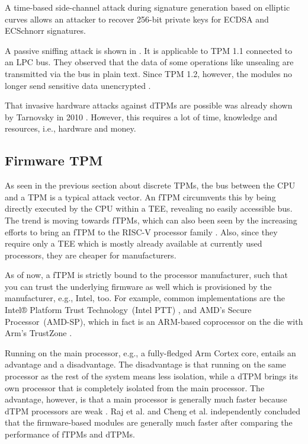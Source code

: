 A time-based side-channel attack \cite{Moghimi2019} during signature generation based on elliptic curves allows an attacker to recover 256-bit private keys for ECDSA and ECSchnorr signatures.

A passive sniffing attack is shown in \cite{Kursawe2005AnalyzingTP}. It is applicable to TPM 1.1 connected to an LPC bus. They observed that the data of some operations like unsealing are transmitted via the bus in plain text. Since TPM 1.2, however, the modules no longer send sensitive data unencrypted \cite{Winter2013}.

That invasive hardware attacks against dTPMs are possible was already shown by Tarnovsky in 2010 \cite{tarnovsky}. However, this requires a lot of time, knowledge and resources, i.e., hardware and money.


\subsection{Firmware TPM}



As seen in the previous section about discrete TPMs, the bus between the CPU and a TPM is a typical attack vector. An fTPM \cite{Raj2015, 197213} circumvents this by being directly executed by the CPU within a \ac{TEE}, revealing no easily accessible bus.
The trend is moving towards fTPMs, which can also been seen by the increasing efforts to bring an fTPM to the RISC-V processor family \cite{Boubakri2021}. Also, since they require only a TEE which is mostly already available at currently used processors, they are cheaper for manufacturers.

As of now, a fTPM is strictly bound to the processor manufacturer, such that you can trust the underlying firmware as well which is provisioned by the manufacturer, e.g., Intel, too. For example, common implementations are the Intel® Platform Trust Technology~(Intel PTT) \cite{intelProcessorSecurity}, and AMD's Secure Processor~(AMD-SP), which in fact is an ARM-based coprocessor on the die with Arm's TrustZone \cite{Khalid2020}.

Running on the main processor, e.g., a fully-fledged Arm Cortex core, entails an advantage and a disadvantage. The disadvantage is that running on the same processor as the rest of the system means less isolation, while a \ac{dTPM} brings its own processor that is completely isolated from the main processor. The advantage, however, is that a main processor is generally much faster because \ac{dTPM} processors are weak \cite{Goh2013, Raj2015}. Raj et al. \cite{Raj2015} and Cheng et al. \cite{Cheng2020} independently concluded that the firmware-based modules are generally much faster after comparing the performance of \acp{fTPM} and \acp{dTPM}.

